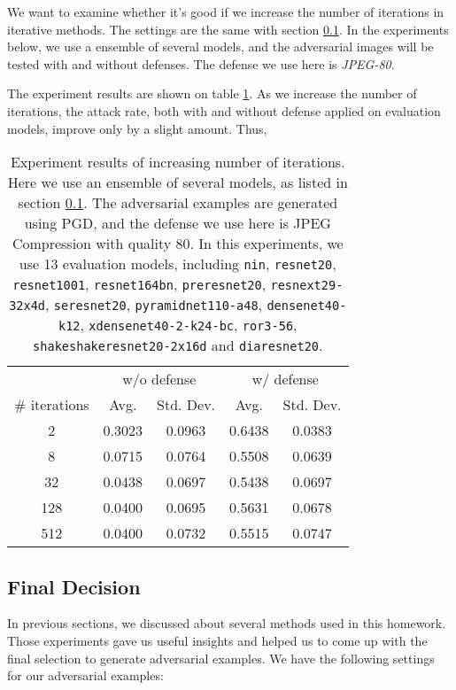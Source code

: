 \documentclass{article}
\begin{document}
We want to examine whether it's good if we increase the number of iterations in iterative methods. The settings are the same with section \ref{final-decision}. In the experiments below, we use a ensemble of several models, and the adversarial images will be tested with and without defenses. The defense we use here is \textit{JPEG-80}.

The experiment results are shown on table \ref{iteration-experiments}. As we increase the number of iterations, the attack rate, both with and without defense applied on evaluation models, improve only by a slight amount. Thus,

\begin{table}
  \label{iteration-experiments}
  \centering
  \caption{
    Experiment results of increasing number of iterations. Here we use an ensemble of several models, as listed in section \ref{final-decision}. The adversarial examples are generated using PGD, and the defense we use here is JPEG Compression with quality 80. In this experiments, we use 13 evaluation models, including \texttt{nin}, \texttt{resnet20}, \texttt{resnet1001}, \texttt{resnet164bn}, \texttt{preresnet20}, \texttt{resnext29-32x4d}, \texttt{seresnet20}, \texttt{pyramidnet110-a48}, \texttt{densenet40-k12}, \texttt{xdensenet40-2-k24-bc}, \texttt{ror3-56}, \texttt{shakeshakeresnet20-2x16d} and \texttt{diaresnet20}.
  }
  \begin{tabular}{ccccc}
    \toprule
    & \multicolumn{2}{c}{w/o defense} & \multicolumn{2}{c}{w/ defense} \\
    \cmidrule(r){2-3} \cmidrule(r){4-5}
    \# iterations & Avg. & Std. Dev. & Avg. & Std. Dev. \\
    \midrule
    2             & 0.3023 & 0.0963 & 0.6438 & 0.0383 \\
    8             & 0.0715 & 0.0764 & 0.5508 & 0.0639 \\
    32            & 0.0438 & 0.0697 & 0.5438 & 0.0697 \\
    128           & 0.0400 & 0.0695 & 0.5631 & 0.0678 \\
    512           & 0.0400 & 0.0732 & 0.5515 & 0.0747 \\
    \bottomrule
  \end{tabular}
\end{table}

\subsection{Final Decision}
\label{final-decision}
In previous sections, we discussed about several methods used in this homework. Those experiments gave us useful insights and helped us to come up with the final selection to generate adversarial examples. We have the following settings for our adversarial examples:
\end{document}
